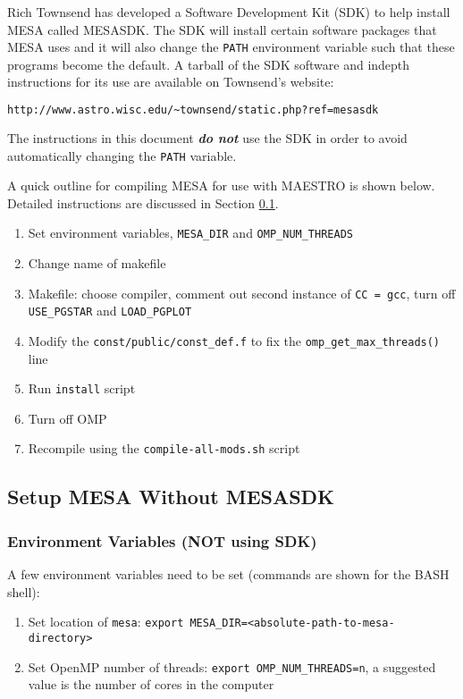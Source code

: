 Rich Townsend has developed a Software Development Kit (SDK) to help install 
{\sf MESA} called {\sf MESASDK}. The SDK will install certain software 
packages that {\sf MESA} uses and it will also change the {\tt PATH} 
environment variable such that these programs become the default. A tarball 
of the SDK software and indepth instructions for its use are available on 
Townsend's website:
\begin{lstlisting}[language=html,mathescape=false]
  http://www.astro.wisc.edu/~townsend/static.php?ref=mesasdk
\end{lstlisting}
The instructions in this document {\bf \emph{do not}} use the SDK in order 
to avoid automatically changing the {\tt PATH} variable.

A quick outline for compiling {\sf MESA} for use with {\sf MAESTRO} is 
shown below. Detailed instructions are discussed in Section \ref{sec:woSDK}.
\begin{enumerate}
\item Set environment variables, {\tt MESA\_DIR} and {\tt OMP\_NUM\_THREADS}
\item Change name of makefile
\item Makefile: choose compiler, comment out second instance of 
{\tt CC = gcc}, turn off {\tt USE\_PGSTAR} and {\tt LOAD\_PGPLOT}
\item Modify the {\tt const/public/const\_def.f} to fix the 
{\tt omp\_get\_max\_threads()} line
\item Run {\tt install} script
\item Turn off OMP
\item Recompile using the {\tt compile-all-mods.sh} script
\end{enumerate}


\subsection{Setup {\sf MESA} Without {\sf MESASDK}}
\label{sec:woSDK}

\subsubsection{Environment Variables (NOT using SDK)}
A few environment variables need to be set (commands are shown for the 
BASH shell):
\begin{enumerate}
\item Set location of {\tt mesa}: 
{\tt export MESA\_DIR=<absolute-path-to-mesa-directory>}

\item Set OpenMP number of threads: {\tt export OMP\_NUM\_THREADS=n}, a 
suggested value is the number of cores in the computer
\end{enumerate}

